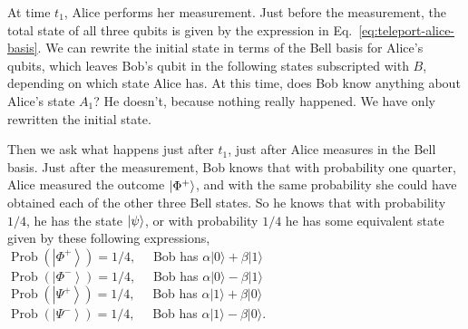 At time $t_1$, Alice performs her measurement. Just before the measurement, the total state of all three qubits is given by the expression in Eq.~\ref{eq:teleport-alice-basis}. We can rewrite the initial state in terms of the Bell basis for Alice's qubits, which leaves Bob's qubit in the following states subscripted with $B$, depending on which state Alice has. At this time, does Bob know anything about Alice's state $A_1$? He doesn't, because nothing really happened. We have only rewritten the initial state.

Then we ask what happens just after $t_1$, just after Alice measures in the Bell basis. Just after the measurement, Bob knows that with probability one quarter, Alice measured the outcome $\left| \Phi^+ \right\rangle$, and with the same probability she could have obtained each of the other three  Bell states. So he knows that with probability $1/4$, he has the state $\left| \psi \right\rangle$, or with probability $1/4$ he has some equivalent state given by these following expressions,\\
$\operatorname{Prob}\left(\left|\Phi^{+}\right\rangle\right)=1 / 4, \quad$ Bob has $\alpha|0\rangle+\beta|1\rangle$\\
$\operatorname{Prob}\left(\left|\Phi^{-}\right\rangle\right)=1 / 4, \quad$ Bob has $\alpha|0\rangle-\beta|1\rangle$\\
$\operatorname{Prob}\left(\left|\Psi^{+}\right\rangle\right)=1 / 4, \quad$ Bob has $\alpha|1\rangle+\beta|0\rangle$\\
$\operatorname{Prob}\left(\left|\Psi^{-}\right\rangle\right)=1 / 4, \quad$ Bob has $\alpha|1\rangle-\beta|0\rangle$.\\

